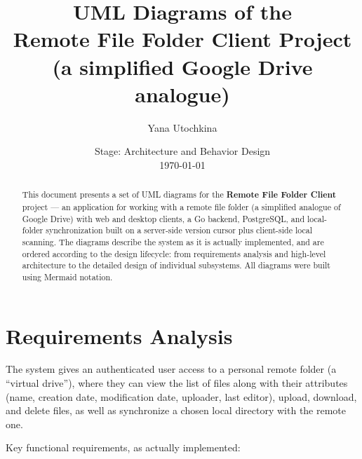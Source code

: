 \documentclass[12pt,a4paper]{article}
\title{\textbf{UML Diagrams of the\\[2pt] \large Remote File Folder Client Project\\(a simplified Google Drive analogue)}}
\author{Yana Utochkina}
\date{Stage: Architecture and Behavior Design \\ \today}
\begin{document}
\maketitle

\begin{abstract}
\noindent
This document presents a set of UML diagrams for the \textbf{Remote File Folder Client} project --- an application for working with a remote file folder (a simplified analogue of Google Drive) with web and desktop clients, a Go backend, PostgreSQL, and local-folder synchronization built on a server-side version cursor plus client-side local scanning. The diagrams describe the system as it is actually implemented, and are ordered according to the design lifecycle: from requirements analysis and high-level architecture to the detailed design of individual subsystems. All diagrams were built using Mermaid notation.
\end{abstract}

\tableofcontents
\newpage

\section{Requirements Analysis}

The system gives an authenticated user access to a personal remote folder (a ``virtual drive''), where they can view the list of files along with their attributes (name, creation date, modification date, uploader, last editor), upload, download, and delete files, as well as synchronize a chosen local directory with the remote one.

Key functional requirements, as actually implemented:
\end{document}
